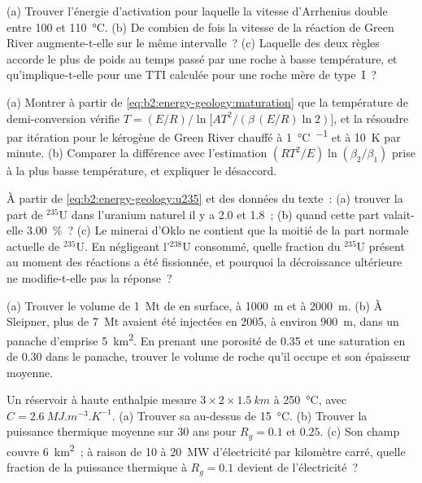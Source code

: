 \begin{exercise}[$\star\star$]\label{exo:b2:energy-geology:5}
(a) Trouver l'énergie d'activation pour laquelle la vitesse d'Arrhenius double entre 100 et
\qty{110}{\celsius}. (b) De combien de fois la vitesse de la réaction de Green River augmente-t-elle sur le même
intervalle~? (c) Laquelle des deux règles accorde le plus de poids au temps passé par une roche à basse température,
et qu'implique-t-elle pour une TTI calculée pour une roche mère de type~I~?
\end{exercise}

\begin{exercise}[$\star\star$]\label{exo:b2:energy-geology:6}
(a) Montrer à partir de \eqref{eq:b2:energy-geology:maturation} que la température de demi-conversion vérifie
$T = (E/R)\big/\ln\bigl[A T^2/(\beta\,(E/R)\ln 2)\bigr]$, et la résoudre par itération
pour le kérogène de Green River chauffé à \qty{1}{\celsius\per\Ma} et à \qty{10}{K} par minute. (b) Comparer
la différence avec l'estimation $(RT^2/E)\ln(\beta_2/\beta_1)$ prise à la plus basse température,
et expliquer le désaccord.
\end{exercise}

\begin{exercise}[$\star\star$]\label{exo:b2:energy-geology:7}
À partir de \eqref{eq:b2:energy-geology:u235} et des données du texte~: (a) trouver la part de $^{235}$U dans l'uranium
naturel il y a \qty{2.0}{\Ga} et \qty{1.8}{\Ga}~; (b) quand cette part valait-elle \qty{3.00}{\percent}~?
(c) Le minerai d'Oklo ne contient que la moitié de la part normale actuelle de $^{235}$U. En négligeant l'$^{238}$U
consommé, quelle fraction du $^{235}$U présent au moment des réactions a été fissionnée, et
pourquoi la décroissance ultérieure ne modifie-t-elle pas la réponse~?
\end{exercise}

\begin{exercise}[$\star\star$]\label{exo:b2:energy-geology:8}
(a) Trouver le volume de \qty{1}{Mt} de  en surface, à \qty{1000}{m} et à
\qty{2000}{m}. (b) À Sleipner, plus de \qty{7}{Mt} avaient été injectées en 2005, à environ
\qty{900}{m}, dans un panache d'emprise \qty{5}{km^2}. En prenant une porosité de 0.35 et une saturation en  de 0.30 dans le panache,
trouver le volume de roche qu'il occupe et son épaisseur moyenne.
\end{exercise}

\begin{exercise}[$\star\star$]\label{exo:b2:energy-geology:9}
Un réservoir à haute enthalpie mesure $3 \times 2 \times \qty{1.5}{km}$ à \qty{250}{\celsius}, avec
$C = \qty{2.6}{MJ.m^{-3}.K^{-1}}$. (a) Trouver sa  au-dessus de \qty{15}{\celsius}. (b) Trouver la
puissance thermique moyenne sur 30 ans pour $R_g = 0.1$ et $0.25$. (c) Son champ couvre \qty{6}{km^2}~;
à raison de 10 à \qty{20}{MW} d'électricité par kilomètre carré, quelle fraction
de la puissance thermique à $R_g = 0.1$ devient de l'électricité~?
\end{exercise}

